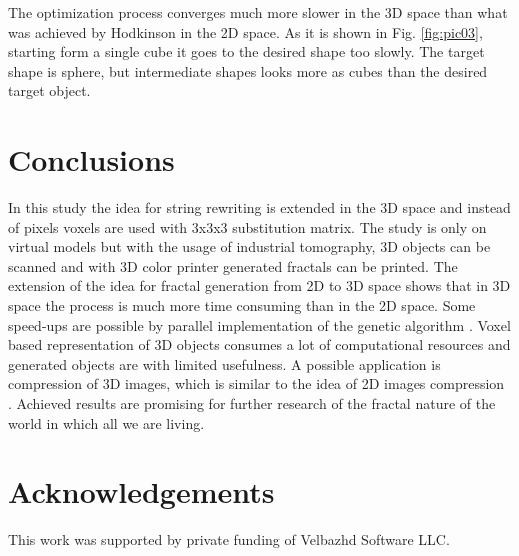 \documentclass[runningheads]{llncs}
\begin{document}
The optimization process converges much more slower in the 3D space than what was achieved by Hodkinson in the 2D space. As it is shown in Fig. \ref{fig:pic03}, starting form a single cube it goes to the desired shape too slowly. The target shape is sphere, but intermediate shapes looks more as cubes than the desired target object.

\section{Conclusions} \label{Conclusions}

In this study the idea for string rewriting is extended in the 3D space and instead of pixels voxels are used with 3x3x3 substitution matrix. The study is only on virtual models but with the usage of industrial tomography, 3D objects can be scanned and with 3D color printer generated fractals can be printed. The extension of the idea for fractal generation from 2D to 3D space shows that in 3D space the process is much more time consuming than in the 2D space. Some speed-ups are possible by parallel implementation of the genetic algorithm \cite{shonkwiler02}. Voxel based representation of 3D objects consumes a lot of computational resources and generated objects are with limited usefulness. A possible application is compression of 3D images, which is similar to the idea of 2D images compression \cite{vences01,albundi01}. Achieved results are promising for further research of the fractal nature of the world in which all we are living. 

\section*{Acknowledgements}
This work was supported by private funding of Velbazhd Software LLC.
\end{document}
